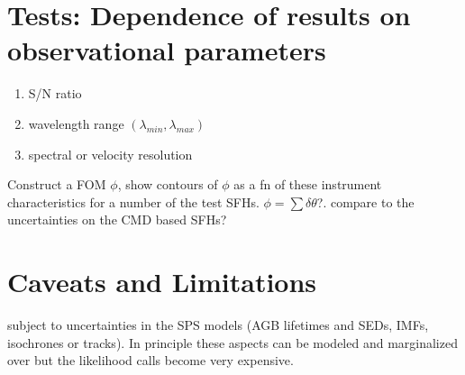 \documentclass{emulateapj}
\begin{document}
\section{Tests: Dependence of results on observational parameters}

\begin{enumerate}
\item S/N ratio
\item wavelength range $(\lambda_{min}, \lambda_{max})$
\item spectral or velocity resolution
\end{enumerate}

Construct a FOM $\phi$, show contours of $\phi$ as a fn of these instrument characteristics for a number of the test SFHs.  $\phi = \sum \delta\theta$?. compare to the uncertainties on the CMD based SFHs?

\section{Caveats and Limitations}
subject to uncertainties in the SPS models (AGB lifetimes and SEDs, IMFs, isochrones or tracks).  In principle these aspects can be modeled and marginalized over \citep{conroy09} but the likelihood calls become very expensive.
\end{document}
